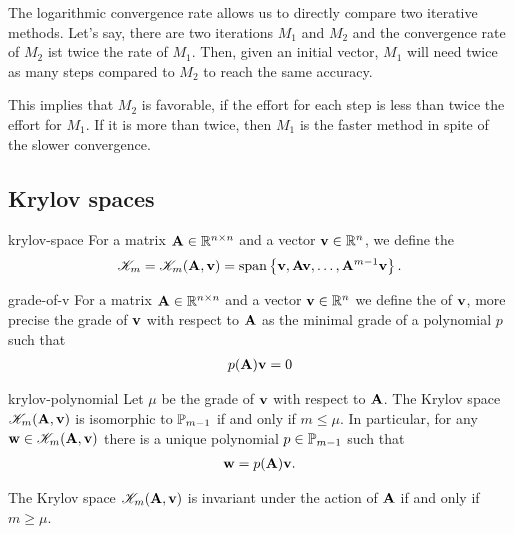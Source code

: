 \begin{remark}
  The logarithmic convergence rate allows us to directly compare two
  iterative methods. Let's say, there are two iterations $M_1$ and
  $M_2$ and the convergence rate of $M_2$ ist twice the rate of
  $M_1$. Then, given an initial vector, $M_1$ will need twice as many
  steps compared to $M_2$ to reach the same accuracy.

  This implies that $M_2$ is favorable, if the effort for each step is
  less than twice the effort for $M_1$. If it is more than twice, then
  $M_1$ is the faster method in spite of the slower convergence.
\end{remark}

\subsection{Krylov spaces}

\begin{Definition}{krylov-space}
  For a matrix $\mata\in\Rnn$ and a vector $\vv\in\R^n$, we define the
  \begin{gather}
    \krylov_m = \krylov_m(\mata,\vv)
    = \spann{\vv,\mata\vv,\dots,\mata^{m-1}\vv}.
  \end{gather}
\end{Definition}

\begin{Definition}{grade-of-v}
  For a matrix $\mata\in\Rnn$ and a vector $\vv\in\R^n$ we define the
   of $\vv$, more precise the grade of $\vv$ with
  respect to $\mata$ as the minimal grade of a polynomial $p$ such
  that
  \begin{gather}
    p(\mata)\vv = 0
  \end{gather}
\end{Definition}

\begin{Lemma}{krylov-polynomial}
  Let $\mu$ be the grade of $\vv$ with respect to $\mata$.  The Krylov
  space $\krylov_m(\mata,\vv)$ is isomorphic to $\P_{m-1}$ if and only
  if $m\le \mu$. In particular, for any $\vw\in\krylov_m(\mata,\vv)$
  there is a unique polynomial $p\in\P_{m-1}$ such that
  \begin{gather}
    \label{eq:krylov-polynomial-1}
    \vw = p(\mata)\vv.
  \end{gather}

  The Krylov space $\krylov_m(\mata,\vv)$ is invariant under the
  action of $\mata$ if and only if $m\ge\mu$.
\end{Lemma}

